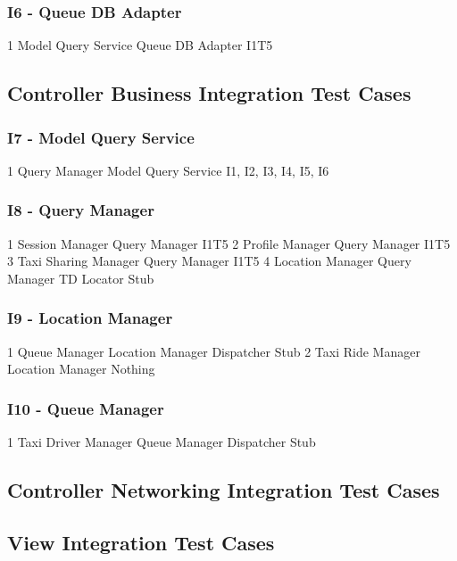 \subsubsection{I6 - Queue DB Adapter}
\testCaseSimpleSimple
	{1}
	{Model Query Service}
	{Queue DB Adapter}
	{I1T5}
\subsection{Controller Business Integration Test Cases}
\subsubsection{I7 - Model Query Service}
\testCaseSimpleSimple
	{1}
	{Query Manager}
	{Model Query Service}
	{I1, I2, I3, I4, I5, I6}
\subsubsection{I8 - Query Manager}
\testCaseSimpleSimple
	{1}
	{Session Manager}
	{Query Manager}
	{I1T5}
\testCaseSimpleSimple
	{2}
	{Profile Manager}
	{Query Manager}
	{I1T5}
\testCaseSimpleSimple
	{3}
	{Taxi Sharing Manager}
	{Query Manager}
	{I1T5}
\testCaseSimpleSimple
	{4}
	{Location Manager}
	{Query Manager}
	{TD Locator Stub}
\subsubsection{I9 - Location Manager}
\testCaseSimpleSimple
	{1}
	{Queue Manager}
	{Location Manager}
	{Dispatcher Stub}
\testCaseSimpleSimple
	{2}
	{Taxi Ride Manager}
	{Location Manager}
	{Nothing}
\subsubsection{I10 - Queue Manager}
\testCaseSimpleSimple
	{1}
	{Taxi Driver Manager}
	{Queue Manager}
	{Dispatcher Stub}
\subsection{Controller Networking Integration Test Cases}
\subsection{View Integration Test Cases}